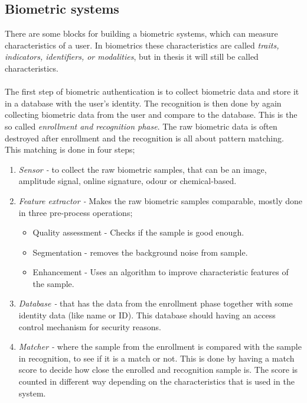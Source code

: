 \subsection{Biometric systems}\label{sec:bioSys}
There are some blocks for building a biometric systems, which can measure characteristics of a user. In biometrics these characteristics are called \textit{traits, indicators, identifiers, or modalities}, but in thesis it will still be called characteristics.\\
\\
The first step of biometric authentication is to collect biometric data and store it in a database with the user’s identity. The recognition is then done by again collecting biometric data from the user and compare to the database. This is the so called \textit{enrollment and recognition phase}. The raw biometric data is often destroyed after enrollment and the recognition is all about pattern matching. This matching is done in four steps;
\begin{enumerate}
	\item \textit{Sensor -} to collect the raw biometric samples, that can be an image, amplitude signal, online signature, odour or chemical-based.
	\item \textit{Feature extractor -} Makes the raw biometric samples comparable, mostly done in three pre-process operations; 
	\begin{itemize}
    	\item Quality assessment - Checks if the sample is good enough.
		\item Segmentation - removes the background noise from sample.
		\item Enhancement - Uses an algorithm to improve characteristic features of the sample.
    \end{itemize}
	\item \textit{Database -} that has the data from the enrollment phase together with some identity data (like name or ID). This database should having an access control mechanism for security reasons.
	\item \textit{Matcher -} where the sample from the enrollment is compared with the sample in recognition, to see if it is a match or not. This is done by having a match score to decide how close the enrolled and recognition sample is. The score is counted in different way depending on the characteristics that is used in the system. 
\end{enumerate}
\cite[ch.~1]{introbio}

